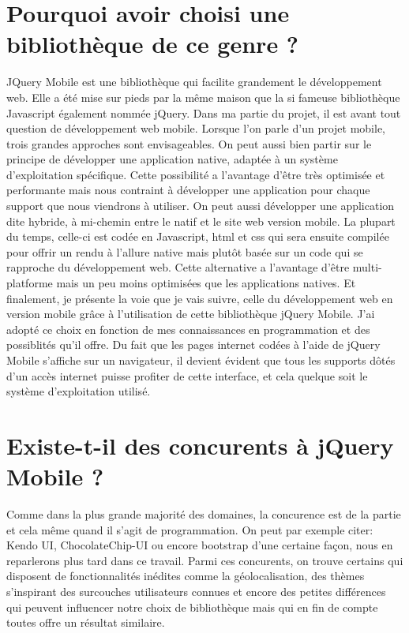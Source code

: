 \documentclass[letterpaper,10pt,french]{sphinxmanual}
\begin{document}
\section{Pourquoi avoir choisi une bibliothèque de ce genre ?}
\label{presentation_jQM:pourquoi-avoir-choisi-une-bibliotheque-de-ce-genre}
JQuery Mobile est une bibliothèque qui facilite grandement le développement web.
Elle a été mise sur pieds par la même maison que la si fameuse bibliothèque
Javascript également nommée jQuery. Dans ma partie du projet, il est avant tout
question de développement web mobile. Lorsque l'on parle d'un projet mobile, trois
grandes approches sont envisageables. On peut aussi bien partir sur le principe
de développer une application native, adaptée à un système d'exploitation spécifique.
Cette possibilité a l'avantage d'être très optimisée et performante mais nous
contraint à développer une application pour chaque support que nous viendrons
à utiliser. On peut aussi développer une application dite hybride, à mi-chemin entre le natif et
le site web version mobile. La plupart du temps, celle-ci est codée en Javascript,
html et css qui sera ensuite compilée pour offrir un rendu à l'allure native mais
plutôt basée sur un code qui se rapproche du développement web. Cette alternative
a l'avantage d'être multi-platforme mais un peu moins optimisées que les
applications natives. Et finalement, je présente la voie que je vais suivre,
celle du développement web en version mobile grâce à l'utilisation de cette
bibliothèque jQuery Mobile. J'ai adopté ce choix en fonction de mes connaissances
en programmation et des possiblités qu'il offre. Du fait que les pages internet
codées à l'aide de jQuery Mobile s'affiche sur un navigateur, il devient
évident que tous les supports dôtés d'un accès internet puisse profiter de cette interface,
et cela quelque soit le système d'exploitation utilisé.


\section{Existe-t-il des concurents à jQuery Mobile ?}
\label{presentation_jQM:existe-t-il-des-concurents-a-jquery-mobile}
Comme dans la plus grande majorité des domaines, la concurence est de
la partie et cela même quand il s'agit de programmation. On peut par exemple citer:
Kendo UI, ChocolateChip-UI ou encore bootstrap d'une certaine façon, nous en
reparlerons plus tard dans ce travail. Parmi ces concurents, on trouve certains
qui disposent de fonctionnalités inédites comme la géolocalisation, des thèmes
s'inspirant des surcouches utilisateurs connues et encore des petites différences
qui peuvent influencer notre choix de bibliothèque mais qui en fin de compte
toutes offre un résultat similaire.
\end{document}
